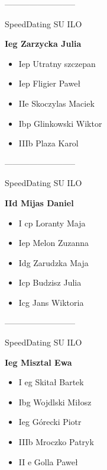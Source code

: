 \documentclass[a4paper,10pt]{article}
\begin{document}
\begin{multicols}{3}
\begin{minipage}[l]{\textwidth}
\begin{itemize}
    \end{itemize}



\end{minipage}



\begin{minipage}[l]{\textwidth}
--------------------------

  \footnotesize{SpeedDating SU ILO}

  \bfseries{Ieg Zarzycka Julia}

  \begin{itemize}
    \item Iep Utratny szczepan
    \item Iep Fligier Paweł
    \item IIe Skoczylas Maciek
    \item Ibp Glinkowski Wiktor
    \item IIIb Plaza Karol

    \end{itemize}



\end{minipage}



\begin{minipage}[l]{\textwidth}
--------------------------

  \footnotesize{SpeedDating SU ILO}

  \bfseries{IId  Mijas Daniel}

  \begin{itemize}
    \item I cp Loranty Maja
    \item Iep Melon Zuzanna
    \item Idg Zarudzka Maja
    \item Icp Budzisz Julia
    \item Icg Jans Wiktoria

    \end{itemize}



\end{minipage}



\begin{minipage}[l]{\textwidth}
--------------------------

  \footnotesize{SpeedDating SU ILO}

  \bfseries{Ieg Misztal Ewa}

  \begin{itemize}
    \item I eg Skitał Bartek
    \item Ibg Wojdlski Miłosz
    \item Ieg Górecki Piotr
    \item IIIb Mroczko Patryk
    \item II e Golla Paweł


\end{itemize}
\end{minipage}
\end{multicols}
\end{document}
